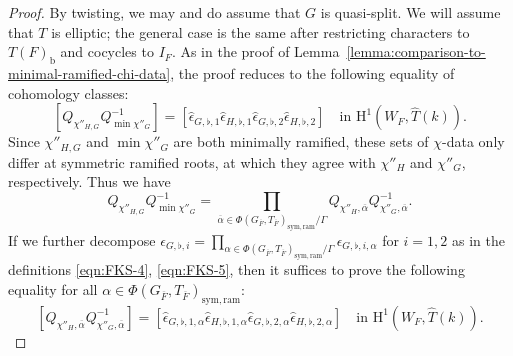 \documentclass[reqno]{amsart}
\numberwithin{equation}{subsection}
\newcommand{\ol}[1]{\overline{#1}}
\newcommand{\wh}[1]{\widehat{#1}}
\newcommand{\rH}{\ensuremath{\mathrm{H}}\xspace}
\theoremstyle{remark}
\numberwithin{equation}{subsection}
\numberwithin{figure}{subsection}
\begin{document}
\begin{proof}
By twisting, we may and do assume that $G$ is quasi-split. We will assume that $T$ is elliptic; the general case is the same after restricting characters to $T(F)_{\mathrm b}$ and cocycles to $I_F$. As in the proof of Lemma~\ref{lemma:comparison-to-minimal-ramified-chi-data}, the proof reduces to the following equality of cohomology classes:
\begin{equation}\label{eqn:signs-cancel-2}
[Q_{\chi''_{H,G}}Q_{\min\chi''_G}^{-1}]=[\wh\epsilon_{G,\flat,1}\wh\epsilon_{H,\flat,1}\wh\epsilon_{G,\flat,2}\wh\epsilon_{H,\flat,2}]\quad\text{in }\rH^1(W_F, \wh T(k)).
\end{equation}
Since $\chi''_{H,G}$ and $\min\chi''_G$ are both minimally ramified, these sets of $\chi$-data only differ at symmetric ramified roots, at which they agree with $\chi''_H$ and $\chi''_G$, respectively. Thus we have
\[
Q_{\chi''_{H,G}}Q_{\min\chi''_G}^{-1} = \prod_{\ol\alpha \in \Phi(G_{\ol F}, T_{\ol F})_{\mathrm{sym,ram}}/\Gamma} Q_{\chi''_H,\ol\alpha}Q_{\chi''_G,\ol\alpha}^{-1}.
\]
If we further decompose $\epsilon_{G,\flat,i} = \prod_{\alpha \in \Phi(G_{\ol F},T_{\ol F})_{\mathrm{sym,ram}}/\Gamma} \epsilon_{G,\flat,i,\alpha}$ for $i = 1, 2$ as in the definitions \eqref{eqn:FKS-4}, \eqref{eqn:FKS-5}, then it suffices to prove the following equality for all $\alpha \in \Phi(G_{\ol F}, T_{\ol F})_{\mathrm{sym,ram}}$:
\begin{equation}\label{eqn:q-difference-root-by-root}
    [Q_{\chi''_H,\ol\alpha}Q_{\chi''_G,\ol\alpha}^{-1}]=[\wh\epsilon_{G,\flat,1,\alpha}\wh\epsilon_{H,\flat,1,\alpha}\wh\epsilon_{G,\flat,2,\alpha}\wh\epsilon_{H,\flat,2,\alpha}]\quad\text{in }\rH^1(W_F, \wh T(k)).
\end{equation}


\end{proof}
\end{document}
